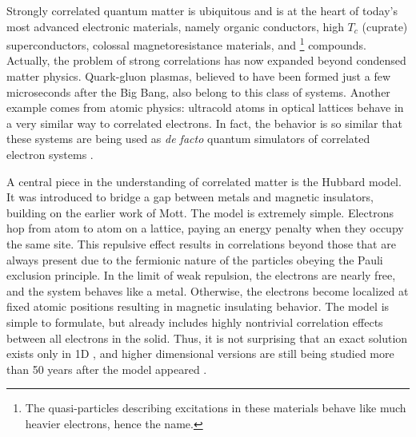 Strongly correlated quantum matter is ubiquitous and is at the heart of today's most advanced electronic materials, namely organic conductors, high $T_c$ (cuprate) superconductors, colossal  magnetoresistance materials, and \footnote{The quasi-particles describing excitations in these materials behave like much heavier electrons, hence the name.} compounds. 
Actually, the problem of strong correlations has now expanded beyond condensed matter physics. Quark-gluon plasmas, believed to have been formed just a few microseconds after the Big Bang, also belong to this class of systems.
Another example comes from atomic physics: ultracold atoms in optical lattices behave in a very similar way to correlated electrons.
In fact, the behavior is so similar that these systems are being used as \emph{de facto} quantum simulators of correlated electron systems \cite{quintanilla_strong-correlations_2009}.

A central piece in the understanding of correlated matter is the Hubbard model.
It was introduced to bridge a gap between metals and magnetic insulators, building on the earlier work of Mott.
The model is extremely simple.
Electrons hop from atom to atom on a lattice, paying an energy penalty when they occupy the same site.
This repulsive effect results in correlations beyond those that are always present due to the fermionic nature of the particles obeying the Pauli exclusion principle.
In the limit of weak repulsion, the electrons are nearly free, and the system behaves like a metal.
Otherwise, the electrons become localized at fixed atomic positions resulting in magnetic insulating behavior.
The model is simple to formulate, but already includes highly nontrivial  correlation effects between all electrons in the solid.
Thus, it is not surprising that an exact solution exists only in \acs{1D} \cite{lieb_absence_1968}, and higher dimensional versions are still being studied more than 50 years after the model appeared \cite{hubbard_electron_1963}.